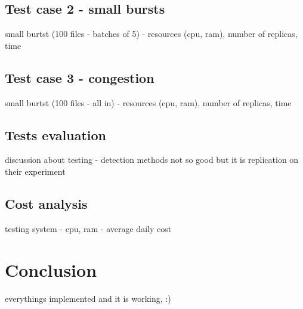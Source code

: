 \section{Test case 2 - small bursts}
small burtst (100 files - batches of 5) - resources (cpu, ram), number of replicas, time
\section{Test case 3 - congestion}
small burtst (100 files - all in) - resources (cpu, ram), number of replicas, time
\section{Tests evaluation}
discussion about testing - detection methods not so good but it is replication on their experiment
\section{Cost analysis}
testing system - cpu, ram - average daily cost 

\chapter{Conclusion}
everythings implemented and it is working, :)